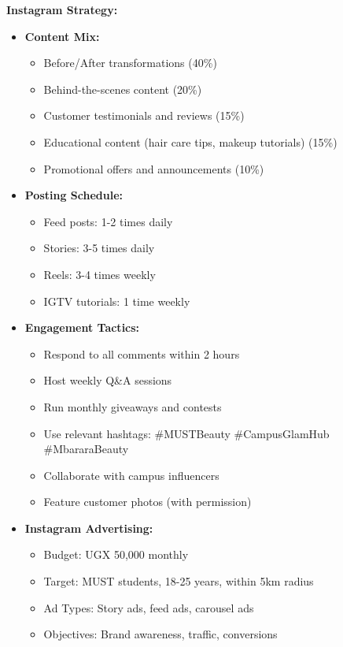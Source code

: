 \textbf{Instagram Strategy:}
\begin{itemize}[leftmargin=2em]
    \item \textbf{Content Mix:}
    \begin{itemize}
        \item Before/After transformations (40\%)
        \item Behind-the-scenes content (20\%)
        \item Customer testimonials and reviews (15\%)
        \item Educational content (hair care tips, makeup tutorials) (15\%)
        \item Promotional offers and announcements (10\%)
    \end{itemize}
    
    \item \textbf{Posting Schedule:}
    \begin{itemize}
        \item Feed posts: 1-2 times daily
        \item Stories: 3-5 times daily
        \item Reels: 3-4 times weekly
        \item IGTV tutorials: 1 time weekly
    \end{itemize}
    
    \item \textbf{Engagement Tactics:}
    \begin{itemize}
        \item Respond to all comments within 2 hours
        \item Host weekly Q\&A sessions
        \item Run monthly giveaways and contests
        \item Use relevant hashtags: \#MUSTBeauty \#CampusGlamHub \#MbararaBeauty
        \item Collaborate with campus influencers
        \item Feature customer photos (with permission)
    \end{itemize}
    
    \item \textbf{Instagram Advertising:}
    \begin{itemize}
        \item Budget: UGX 50,000 monthly
        \item Target: MUST students, 18-25 years, within 5km radius
        \item Ad Types: Story ads, feed ads, carousel ads
        \item Objectives: Brand awareness, traffic, conversions
    \end{itemize}
\end{itemize}

